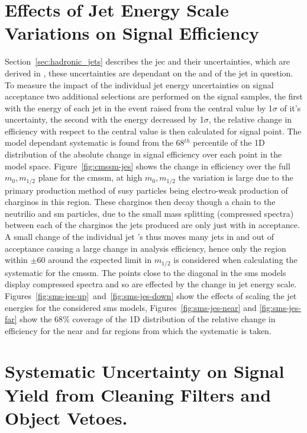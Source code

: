 \section{Effects of Jet Energy Scale Variations on Signal Efficiency} 
\label{sub:effects_of_jet_energy_scale_on_signal_efficiency}
Section~\ref{sec:hadronic_jets} describes the \ac{jec} and their uncertainties, 
which are derived in \cite{}, these uncertainties are dependant on the \mETA 
and \ET of the jet in question. To measure the impact of the individual jet 
energy uncertainties on signal acceptance two additional selections are 
performed on the signal samples, the first with the energy of each jet in the 
event raised from the central value by 1$\sigma$ of it's uncertainty, the 
second with the energy decreased by 1$\sigma$, the relative change in 
efficiency with respect to the central value is then calculated for signal 
point. The model dependant systematic is found from the 68$^{th}$ percentile of 
the 1D distribution of the absolute change in signal efficiency over each point 
in the model space. Figure~\ref{fig:cmssm-jes} shows the change in efficiency 
over the full $m_{0}, m_{1/2}$ plane for the \ac{cmssm}, at high $m_{0}, 
m_{1/2}$ the variation is large due to the primary production method of 
\ac{susy} particles being electro-weak production of charginos in this region. 
These charginos then decay though a chain to the neutrilio and \ac{sm} 
particles, due to the small mass splitting (compressed spectra) between each of 
the charginos the jets produced are only just with in \ET acceptance. A small 
change of the individual jet \ET's thus moves many jets in and out of 
acceptance causing a large change in analysis efficiency, hence only the region 
within $\pm$\unit{60}{\GeV} around the expected limit in $m_{1/2}$ is 
considered when calculating the systematic for the \ac{cmssm}. The points close 
to the diagonal in the \ac{sms} models display compressed spectra and so are 
effected by the change in jet energy scale. 
Figures~\ref{fig:sms-jes-up}~and~\ref{fig:sms-jes-down} show the effects of 
scaling the jet energies for the considered \ac{sms} models, 
Figures~\ref{fig:sms-jes-near} and \ref{fig:sms-jes-far} show the 68$\%$ 
coverage of the 1D distribution of the relative change in efficiency for the 
near and far regions from which the systematic is taken.

\section{Systematic Uncertainty on Signal Yield from Cleaning Filters and Object Vetoes.} %
\label{sub:systematic_uncertainty_on_signal_yield_from_cleaning_filters_and_object_vetoes_}

